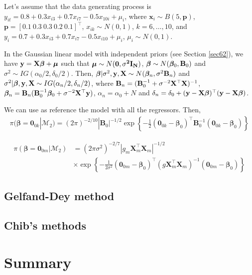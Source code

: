 Let's assume that the data generating process is $y_{it}=0.8+0.3x_{i3}+0.7x_{i7}-0.5x_{10i}+\mu_i$, where $\bm{x}_{i}\sim B(5, \bm{p})$,  $\bm{p}=[0.1 \ 0.3 \ 0.3 \ 0.2 \ 0.1]^{\top}$, $x_{ik}\sim N(0,1)$, $k=6,\dots,10$, and $y_i=0.7+0.3x_{i3}+0.7x_{i7}-0.5x_{i10}+\mu_i$, $\mu_i\sim N(0,1)$. 

In the Gaussian linear model with independent priors (see Section \ref{sec62}), we have ${\bf{y}}={\bf{X}}\bm{\bm{\beta}}+\bm{\mu}$ such that $\bm{\mu}\sim N(\bf{0},\sigma^2\bf{I}_N)$, $\bm{\beta} \sim N(\bm{\beta}_0, {\bf{B}}_0)$ and $\sigma^2 \sim IG(\alpha_0/2, \delta_0/2)$. Then, $\bm{\beta}|\sigma^2, {\bf{y}}, {\bf{X}} \sim N(\bm{\beta}_n, \sigma^2{\bf{B}}_n)$ and $\sigma^2|\bm{\beta}, {\bf{y}}, {\bf{X}} \sim IG(\alpha_n/2, \delta_n/2)$, where  ${\bf{B}}_n = ({\bf{B}}_0^{-1} + \sigma^{-2} {\bf{X}}^{\top}{\bf{X}})^{-1}$, $\bm{\beta}_n= {\bf{B}}_n({\bf{B}}_0^{-1}\bm{\beta}_0 + \sigma^{-2} {\bf{X}}^{\top}{\bf{y}})$, $\alpha_n = \alpha_0 + N$ and $\delta_n = \delta_0 + ({\bf{y}}-{\bf{X}}\bm{\beta})^{\top}({\bf{y}}-{\bf{X}}\bm{\beta})$.

We can use as reference the model with all the regressors. Then,
\begin{align*}
	\pi(\bm{\beta}=\bm{0}_{0k}|\mathcal{M}_2)=(2\pi)^{-2/10}|\bm{B}_{0}|^{-1/2}\exp\left\{-\frac{1}{2}(\bm{0}_{0k}-\bm{\beta}_{0})^{\top}\bm{B}_{0}^{-1}(\bm{0}_{0k}-\bm{\beta}_{0})\right\}
\end{align*}  

\begin{align*}
	\pi(\bm{\beta}=\bm{0}_{0m}|\mathcal{M}_2)&=(2\pi\sigma^2)^{-2/7}|g_m\bm{X}_m^{\top}\bm{X}_m|^{-1/2}\\
	&\times\exp\left\{-\frac{1}{2\sigma^2}(\bm{0}_{0m}-\bm{\beta}_{0})^{\top}(g\bm{X}_m^{\top}\bm{X}_m)^{-1}(\bm{0}_{0m}-\bm{\beta}_{0})\right\}
\end{align*}  

\subsection{Gelfand-Dey method}\label{sec10_12}

\subsection{Chib's methods}\label{sec10_13}

\section{Summary}\label{sec10_7}

